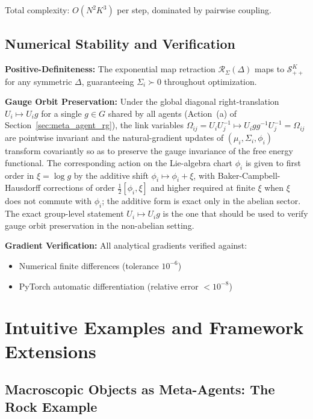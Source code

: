 \documentclass[11pt]{article}
\begin{document}
Total complexity: $O(N^2 K^3)$ per step, dominated by pairwise coupling.

\subsection*{Numerical Stability and Verification}

\textbf{Positive-Definiteness:} The exponential map retraction $\mathcal{R}_{\Sigma}(\Delta)$ maps to $\mathcal{S}_{++}^K$ for any symmetric $\Delta$, guaranteeing $\Sigma_i \succ 0$ throughout optimization.

\textbf{Gauge Orbit Preservation:} Under the global diagonal right-translation $U_i \mapsto U_i g$ for a single $g \in G$ shared by all agents (Action~(a) of Section~\ref{sec:meta_agent_rg}), the link variables $\Omega_{ij} = U_iU_j^{-1} \mapsto U_i g g^{-1} U_j^{-1} = \Omega_{ij}$ are pointwise invariant and the natural-gradient updates of $(\mu_i, \Sigma_i, \phi_i)$ transform covariantly so as to preserve the gauge invariance of the free energy functional. The corresponding action on the Lie-algebra chart $\phi_i$ is given to first order in $\xi = \log g$ by the additive shift $\phi_i \mapsto \phi_i + \xi$, with Baker-Campbell-Hausdorff corrections of order $\tfrac{1}{2}[\phi_i, \xi]$ and higher required at finite $\xi$ when $\xi$ does not commute with $\phi_i$; the additive form is exact only in the abelian sector. The exact group-level statement $U_i \mapsto U_i g$ is the one that should be used to verify gauge orbit preservation in the non-abelian setting.

\textbf{Gradient Verification:} All analytical gradients verified against:
\begin{itemize}
\item Numerical finite differences (tolerance $10^{-6}$)
\item PyTorch automatic differentiation (relative error $< 10^{-8}$)
\end{itemize}

\section{Intuitive Examples and Framework Extensions}
\label{app:examples}

\subsection{Macroscopic Objects as Meta-Agents: The Rock Example}
\end{document}
